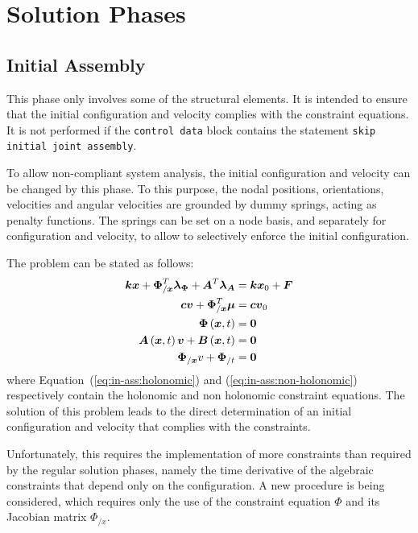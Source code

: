 \documentclass[10pt,dvips,fleqn]{report}
\newcommand{\T}[1]{\boldsymbol{#1}}
\begin{document}
\chapter{Solution Phases}
\section{Initial Assembly}
This phase only involves some of the structural elements.
It is intended to ensure that the initial configuration and velocity 
complies with the constraint equations.
It is not performed if the \texttt{control data} block contains 
the statement \texttt{skip initial joint assembly}.

To allow non-compliant system analysis, the initial configuration 
and velocity can be changed by this phase.
To this purpose, the nodal positions, orientations, velocities
and angular velocities are grounded by dummy springs, acting 
as penalty functions.
The springs can be set on a node basis, and separately 
for configuration and velocity, to allow to selectively enforce 
the initial configuration.

The problem can be stated as follows:
\begin{align}
	\T{k} \T{x} + \T{\Phi}_{/\T{x}}^T \T{\lambda}_{\T{\Phi}} + \T{A}^T \T{\lambda}_{\T{A}}
		& = \T{k} \T{x}_0 + \T{F} \\
	\T{c} \T{v} + \T{\Phi}_{/\T{x}}^T \T{\mu} & = \T{c} \T{v}_0 \\
	\T{\Phi}\plbr{\T{x}, t} & = \T{0} \label{eq:in-ass:holonomic} \\
	\T{A}\plbr{\T{x}, t} \T{v} + \T{B}\plbr{\T{x}, t} & = \T{0} \label{eq:in-ass:non-holonomic} \\
	\T{\Phi}_{/\T{x}} v + \T{\Phi}_{/t} & = \T{0}
\end{align}
where Equation~(\ref{eq:in-ass:holonomic}) and (\ref{eq:in-ass:non-holonomic})
respectively contain the holonomic and non holonomic constraint equations.
The solution of this problem leads to the direct determination
of an initial configuration and velocity that complies 
with the constraints.

Unfortunately, this requires the implementation of more constraints
than required by the regular solution phases, namely the time derivative
of the algebraic constraints that depend only on the configuration.
A new procedure is being considered, which requires only the use 
of the constraint equation $\Phi$ and its Jacobian matrix $\Phi_{/x}$.
\end{document}
